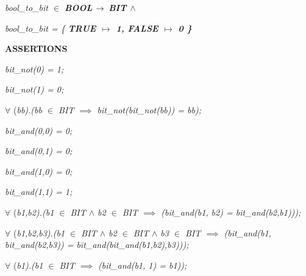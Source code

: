 \begin{sloppypar}
\hspace*{0.20in}\it bool\_to\_bit  $\in$  \bf BOOL  $\rightarrow$  \it BIT  $\land$ 

\hspace*{0.20in}\it bool\_to\_bit \rm = \rm \{ \bf TRUE  $\mapsto$  \rm 1\rm , \bf FALSE  $\mapsto$  \rm 0 \rm \}

\vspace*{4mm}
\bf ASSERTIONS

\hspace*{0.20in}\it bit\_not\rm (\rm 0\rm ) \rm = \rm 1\rm ;

\hspace*{0.20in}\it bit\_not\rm (\rm 1\rm ) \rm = \rm 0\rm ;

\hspace*{0.20in} $\forall$ \rm (\it bb\rm )\rm .\rm (\it bb  $\in$  \it BIT  $\implies$  \it bit\_not\rm (\it bit\_not\rm (\it bb\rm )\rm ) \rm = \it bb\rm )\rm ;

\vspace*{4mm}
\hspace*{0.20in}\it bit\_and\rm (\rm 0\rm ,\rm 0\rm ) \rm = \rm 0\rm ;

\hspace*{0.20in}\it bit\_and\rm (\rm 0\rm ,\rm 1\rm ) \rm = \rm 0\rm ;

\hspace*{0.20in}\it bit\_and\rm (\rm 1\rm ,\rm 0\rm ) \rm = \rm 0\rm ;

\hspace*{0.20in}\it bit\_and\rm (\rm 1\rm ,\rm 1\rm ) \rm = \rm 1\rm ;

\hspace*{0.20in} $\forall$ \rm (\it b1\rm ,\it b2\rm )\rm .\rm (\it b1  $\in$  \it BIT  $\land$  \it b2  $\in$  \it BIT  $\implies$  \rm (\it bit\_and\rm (\it b1\rm , \it b2\rm ) \rm = \it bit\_and\rm (\it b2\rm ,\it b1\rm )\rm )\rm )\rm ;

\hspace*{0.20in} $\forall$ \rm (\it b1\rm ,\it b2\rm ,\it b3\rm )\rm .\rm (\it b1  $\in$  \it BIT  $\land$  \it b2  $\in$  \it BIT  $\land$  \it b3  $\in$  \it BIT  $\implies$  \rm (\it bit\_and\rm (\it b1\rm , \it bit\_and\rm (\it b2\rm ,\it b3\rm )\rm ) \rm = \it bit\_and\rm (\it bit\_and\rm (\it b1\rm ,\it b2\rm )\rm ,\it b3\rm )\rm )\rm )\rm ;

\hspace*{0.20in} $\forall$ \rm (\it b1\rm )\rm .\rm (\it b1  $\in$  \it BIT  $\implies$  \rm (\it bit\_and\rm (\it b1\rm , \rm 1\rm ) \rm = \it b1\rm )\rm )\rm ;


\end{sloppypar}
